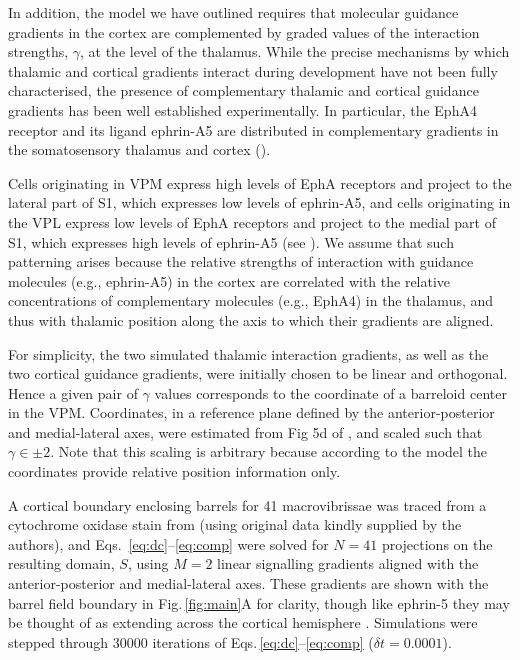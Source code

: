 \documentclass[9pt,lineno]{elife}
\newcommand{\cmnt}[1]{\textcolor{colcmnt}{#1}}
\begin{document}
\cmnt{In addition, the model we have outlined requires that molecular
  guidance gradients in the cortex are complemented by graded values of the
  interaction strengths, $\gamma$, at the level of the thalamus. While the
  precise mechanisms by which thalamic and cortical gradients interact during
  development have not been fully characterised, the presence of complementary
  thalamic and cortical guidance gradients has been well established
  experimentally. In particular, the EphA4 receptor and its ligand ephrin-A5
  are distributed in complementary gradients in the somatosensory thalamus and
  cortex} (\citealp{vanderhaeghen_mapping_2000,miller_epha7-ephrin-a5_2006}).

\cmnt{Cells originating in VPM express high levels of EphA receptors and
  project to the lateral part of S1, which expresses low levels of ephrin-A5,
  and cells originating in the VPL express low levels of EphA receptors and
  project to the medial part of S1, which expresses high levels of ephrin-A5}
(see
\citealp{gao_regulation_1998,dufour_area_2003,vanderhaeghen_developmental_2004,speer_grading_2005,torii_role_2013}).
\cmnt{We assume that such patterning arises because the relative strengths of
  interaction with guidance molecules (e.g., ephrin-A5) in the cortex are
  correlated with the relative concentrations of complementary molecules
  (e.g., EphA4) in the thalamus, and thus with thalamic position along the
  axis to which their gradients are aligned.}

\cmnt{For simplicity, the two simulated thalamic interaction gradients, as
  well as the two cortical guidance gradients, were initially chosen to be
  linear and orthogonal. Hence a given pair of $\gamma$ values corresponds to
  the coordinate of a barreloid center in the VPM. Coordinates, in a reference
  plane defined by the anterior-posterior and medial-lateral axes, were
  estimated from Fig 5d of} \cite{haidarliu_size_2001}, \cmnt{and scaled
  such that $\gamma\in\pm 2$. Note that this scaling is arbitrary because
  according to the model the coordinates provide relative position information
  only.}

A cortical boundary enclosing barrels for 41 \cmnt{macrovibrissae} was
traced from a cytochrome oxidase stain from \cite{zheng_signal_2001}
\cmnt{(using original data kindly supplied by the authors)}, and
Eqs.~\ref{eq:dc}--\ref{eq:comp} were solved for $N=41$ projections on the
resulting domain, $S$, using $M=2$ linear signalling gradients aligned with
the anterior-posterior and medial-lateral axes.  \cmnt{These gradients are
  shown with the barrel field boundary in Fig.\,\ref{fig:main}A for clarity,
  though like ephrin-5 they may be thought of as extending across the cortical
  hemisphere \citep{miller_epha7-ephrin-a5_2006}. Simulations were stepped
  through 30000 iterations of Eqs.\,\ref{eq:dc}--\ref{eq:comp} ($\delta
  t=0.0001$).}
\end{document}

